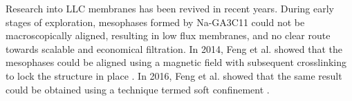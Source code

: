 \documentclass{article}
\begin{document}
  Research into LLC membranes has been revived in recent years. During early
  stages of exploration, mesophases formed by Na-GA3C11 could not be
  macroscopically aligned, resulting in low flux membranes, and no clear route
  towards scalable and economical filtration. In 2014, Feng et al. showed that
  the mesophases could be aligned using a magnetic field with subsequent
  crosslinking to lock the structure in place \cite{feng_scalable_2014}. In 2016,
  Feng et al. showed that the same result could be obtained using a technique
  termed soft confinement \cite{feng_thin_2016}.


\end{document}
